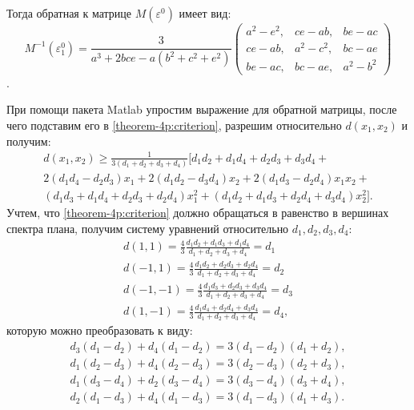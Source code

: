 	Тогда обратная к матрице $M(\varepsilon^0)$ имеет вид:
	\begin{equation} \label{theorem-4p:inv-matrix}
		M^{-1}(\varepsilon_1^0) = \frac 3 {a^3 + 2 b c e - a(b^2 + c^2 + e^2)}
		\begin{pmatrix}
			a^2 - e^2,& ce - ab, & be - ac\\
			ce - ab,& a^2-c^2,& bc-ae\\
			be - ac,& bc - ae,& a^2 - b^2			
		\end{pmatrix} 
	\end{equation}.	
	
	При помощи пакета Matlab упростим выражение для обратной матрицы, после чего подставим его в \eqref{theorem-4p:criterion}, разрешим относительно $d(x_1, x_2)$ и получим:
	\begin{gather*}
		d(x_1, x_2) \ge \frac 1 {3 (d_1 + d_2 + d_3 + d_4)} 
		[ 
			d_1 d_2 + d_1 d_4 + d_2 d_3 + d_3 d_4 +  \\
			2 (d_1 d_4 - d_2 d_3)x_1 + 2 (d_1 d_2 - d_3 d_4) x_2 +
			2 (d_1 d_3 - d_2 d_4)x_1 x_2 + \\
			(d_1 d_3 + d_1 d_4 + d_2 d_3 + d_2 d_4)x_1^2 + 
			(d_1 d_2 + d_1 d_3 + d_2 d_4 + d_3 d_4)x_2^2
		].
	\end{gather*}
	Учтем, что \eqref{theorem-4p:criterion} должно обращаться в равенство в вершинах спектра плана, получим систему уравнений относительно $d_1, d_2, d_3, d_4$:
	\begin{gather*}
		d(1, 1) = \frac 4 3 \frac {d_1 d_2 + d_1 d_3 + d_1 d_4} {d_1 + d_2 + d_3 + d_4} = d_1 \\
		d(-1, 1) = \frac 4 3 \frac {d_1 d_2 + d_2 d_3 + d_2 d_4} {d_1 + d_2 + d_3 + d_4} = d_2 \\
		d(-1, -1) = \frac 4 3 \frac {d_1 d_3 + d_2 d_3 + d_3 d_4} {d_1 + d_2 + d_3 + d_4} = d_3 \\
		d(1, -1) = \frac 4 3 \frac {d_1 d_4 + d_2 d_4 + d_3 d_4} {d_1 + d_2 + d_3 + d_4} = d_4,
	\end{gather*}
	которую можно преобразовать к виду:
	\begin{gather*}
		d_3 (d_1 - d_2) + d_4 (d_1 - d_2) = 3 (d_1 - d_2) (d_1 + d_2), \\
		d_1 (d_2 - d_3) + d_4 (d_2 - d_3) = 3 (d_2 - d_3) (d_2 + d_3), \\
		d_1 (d_3 - d_4) + d_2 (d_3 - d_4) = 3 (d_3 - d_4) (d_3 + d_4), \\
		d_2 (d_1 - d_3) + d_4 (d_1 - d_3) = 3 (d_1 - d_3) (d_1 + d_3). \\
	\end{gather*}
